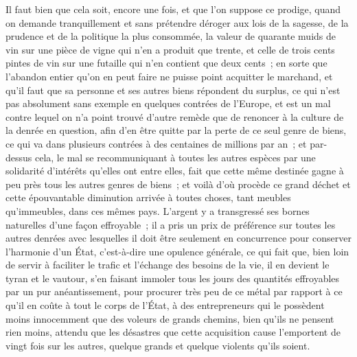\documentclass[french,twoside]{book} %
\begin{document}
Il faut bien que cela soit, encore une fois, et que l’on suppose ce prodige, quand on demande tranquillement et sans prétendre déroger aux lois de la sagesse, de la prudence et de la politique la plus consommée, la valeur de quarante muids de vin sur une pièce de vigne qui n’en a produit que trente, et celle de trois cents pintes de vin sur une futaille qui n’en contient que deux cents ; en sorte que l’abandon entier qu’on en peut faire ne puisse point acquitter le marchand, et qu’il faut que sa personne et ses autres biens répondent du surplus, ce qui n’est pas absolument sans exemple en quelques contrées de l’Europe, et est un mal contre lequel on n’a point trouvé d’autre remède que de renoncer à la culture de la denrée en question, afin d’en être quitte par la perte de ce seul genre de biens, ce qui va dans plusieurs contrées à des centaines de millions par an ; et par-dessus cela, le mal se recommuniquant à toutes les autres espèces par une solidarité d’intérêts qu’elles ont entre elles, fait que cette même destinée gagne à peu près tous les autres genres de biens ; et voilà d’où procède ce grand déchet et cette épouvantable diminution arrivée à toutes choses, tant meubles qu’immeubles, dans ces mêmes pays. L’argent y a transgressé ses bornes naturelles d’une façon effroyable ; il a pris un prix de préférence sur toutes les autres denrées avec lesquelles il doit être seulement en concurrence pour conserver l’harmonie d’un État, c’est-à-dire une opulence générale, ce qui fait que, bien loin de servir à faciliter le trafic et l’échange des besoins de la vie, il en devient le tyran et le vautour, s’en faisant immoler tous les jours des quantités effroyables par un pur anéantissement, pour procurer très peu de ce métal par rapport à ce qu’il en coûte à tout le corps de l’État, à des entrepreneurs qui le possèdent moins innocemment que des voleurs de grands chemins, bien qu’ils ne pensent rien moins, attendu que les désastres que cette acquisition cause l’emportent de vingt fois sur les autres, quelque grands et quelque violents qu’ils soient.
\end{document}
